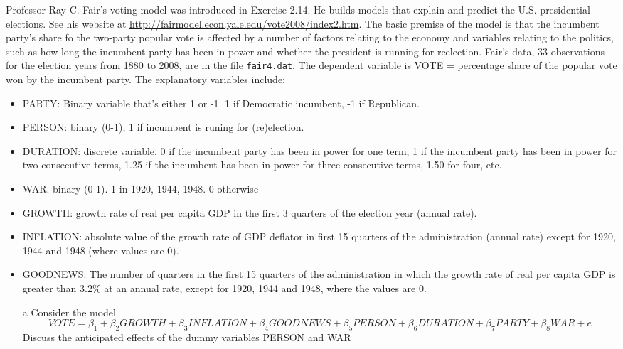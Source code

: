 \documentclass[xcolor={dvipsnames}]{beamer}
\begin{document}
\begin{frame}[allowframebreaks]{7.14}
	Professor Ray C. Fair's voting model was introduced in Exercise 2.14. He builds models that explain and predict the U.S. presidential elections. See his website at \url{http://fairmodel.econ.yale.edu/vote2008/index2.htm}. The basic premise of the model is that the incumbent party's share fo the two-party popular vote is affected by a number of factors relating to the economy and variables relating to the politics, such as how long the incumbent party has been in power and whether the president is running for reelection. Fair's data, 33 observations for the election years from 1880 to 2008, are in the file \texttt{fair4.dat}. The dependent variable is VOTE = percentage share of the popular vote won by the incumbent party. The explanatory variables include:
	\begin{itemize}
		\item PARTY: Binary variable that's either 1 or -1. 1 if Democratic incumbent, -1 if Republican.
		\item PERSON: binary (0-1), 1 if incumbent is runing for (re)election.
		\item DURATION: discrete variable. 0 if the incumbent party has been in power for one term, 1 if the incumbent party has been in power for two consecutive terms, 1.25 if the incumbent has been in power for three consecutive terms, 1.50 for four, etc.
		\item WAR. binary (0-1). 1 in 1920, 1944, 1948. 0 otherwise
		\item GROWTH: growth rate of real per capita GDP in the first 3 quarters of the election year (annual rate). 
		\item INFLATION: absolute value of the growth rate of GDP deflator in first 15 quarters of the administration (annual rate) except for 1920, 1944 and 1948 (where values are 0).
		\item GOODNEWS: The number of quarters in the first 15 quarters of the administration in which the growth rate of real per capita GDP is greater than 3.2\% at an annual rate, except for 1920, 1944 and 1948, where the values are 0.
	\end{itemize}
	
	\begin{itemize}
		\item[a] Consider the model $$VOTE = \beta_1 + \beta_2 GROWTH + \beta_3INFLATION + \beta_4 GOODNEWS + \beta_5 PERSON + \beta_6 DURATION + \beta_7 PARTY + \beta_8 WAR + e$$ Discuss the anticipated effects of the dummy variables PERSON and WAR


\end{itemize}
\end{frame}
\end{document}
